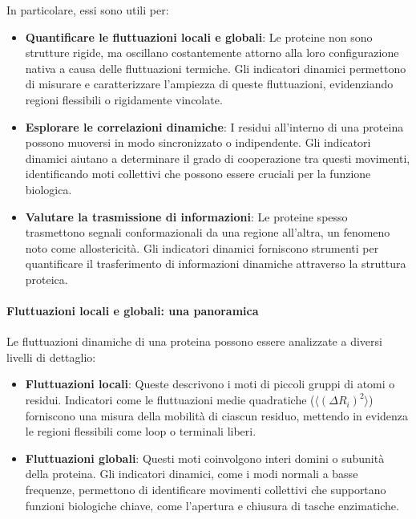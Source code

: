 \documentclass[Lau,binding=0.6cm,oneside,noexaminfo]{sapthesis}
\begin{document}
In particolare, essi sono utili per:
\begin{itemize}
    \item \textbf{Quantificare le fluttuazioni locali e globali}: Le proteine non sono strutture rigide, ma oscillano costantemente attorno alla loro configurazione nativa a causa delle fluttuazioni termiche. Gli indicatori dinamici permettono di misurare e caratterizzare l'ampiezza di queste fluttuazioni, evidenziando regioni flessibili o rigidamente vincolate.
    \item \textbf{Esplorare le correlazioni dinamiche}: I residui all'interno di una proteina possono muoversi in modo sincronizzato o indipendente. Gli indicatori dinamici aiutano a determinare il grado di cooperazione tra questi movimenti, identificando moti collettivi che possono essere cruciali per la funzione biologica.
    \item \textbf{Valutare la trasmissione di informazioni}: Le proteine spesso trasmettono segnali conformazionali da una regione all'altra, un fenomeno noto come allostericità. Gli indicatori dinamici forniscono strumenti per quantificare il trasferimento di informazioni dinamiche attraverso la struttura proteica.
\end{itemize}

\paragraph{Fluttuazioni locali e globali: una panoramica}
Le fluttuazioni dinamiche di una proteina possono essere analizzate a diversi livelli di dettaglio:
\begin{itemize}
    \item \textbf{Fluttuazioni locali}: Queste descrivono i moti di piccoli gruppi di atomi o residui. Indicatori come le fluttuazioni medie quadratiche ($\langle (\Delta R_i)^2 \rangle$) forniscono una misura della mobilità di ciascun residuo, mettendo in evidenza le regioni flessibili come loop o terminali liberi.
    \item \textbf{Fluttuazioni globali}: Questi moti coinvolgono interi domini o subunità della proteina. Gli indicatori dinamici, come i modi normali a basse frequenze, permettono di identificare movimenti collettivi che supportano funzioni biologiche chiave, come l'apertura e chiusura di tasche enzimatiche.
\end{itemize}
\end{document}
